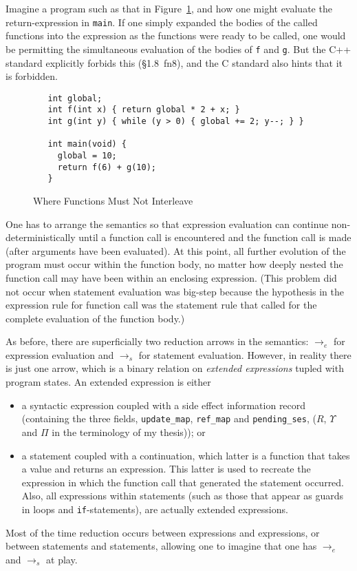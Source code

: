 \documentclass[11pt]{article}
\newcommand{\cpp}{\mbox{C\hspace{-0.5pt}+\hspace{-1.5pt}+}}
\begin{document}
Imagine a program such as that in Figure~\ref{fig:two-functions}, and
how one might evaluate the return-expression in \texttt{main}.  If one
simply expanded the bodies of the called functions into the expression
as the functions were ready to be called, one would be permitting the
simultaneous evaluation of the bodies of \texttt{f} and \texttt{g}.
But the \cpp{} standard explicitly forbids this (\S1.8~fn8), and the C
standard also hints that it is forbidden.
\begin{figure}[htbp]
\begin{verbatim}
   int global;
   int f(int x) { return global * 2 + x; }
   int g(int y) { while (y > 0) { global += 2; y--; } }

   int main(void) {
     global = 10;
     return f(6) + g(10);
   }
\end{verbatim}
\caption{Where Functions Must Not Interleave}
\label{fig:two-functions}
\end{figure}

One has to arrange the semantics so that expression evaluation can
continue non-deterministically until a function call is encountered
and the function call is made (after arguments have been evaluated).
At this point, all further evolution of the program must occur within
the function body, no matter how deeply nested the function call may
have been within an enclosing expression.  (This problem did not occur
when statement evaluation was big-step because the hypothesis in the
expression rule for function call was the statement rule that called
for the complete evaluation of the function body.)

As before, there are superficially two reduction arrows in the
semantics: $\rightarrow_e$ for expression evaluation and
$\rightarrow_s$ for statement evaluation.  However, in reality there
is just one arrow, which is a binary relation on \emph{extended
  expressions} tupled with program states.  An extended expression is
either
\begin{itemize}
\item a syntactic expression coupled with a side effect information
  record (containing the three fields, \texttt{update\_map},
  \texttt{ref\_map} and \texttt{pending\_ses}, ($R$, $\Upsilon$ and
  $\Pi$ in the terminology of my thesis)); or
\item a statement coupled with a continuation, which latter is a
  function that takes a value and returns an expression.  This latter
  is used to recreate the expression in which the function call
  that generated the statement occurred.  Also, all expressions within
  statements (such as those that appear as guards in loops and
  \texttt{if}-statements), are actually extended expressions.
\end{itemize}
Most of the time reduction occurs between expressions and expressions,
or between statements and statements, allowing one to imagine that one
has $\rightarrow_e$ and $\rightarrow_s$ at play.
\end{document}
